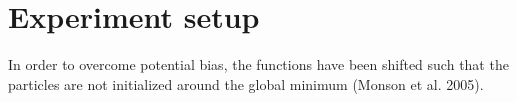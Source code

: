 \documentclass{csfourzero}
\begin{document}

\section{Experiment setup}

In order to overcome potential bias, the functions have been shifted such that
the particles are not initialized around the global minimum (Monson et al.
2005).



\end{document}
